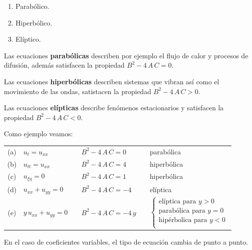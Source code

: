 \begin{enumerate}
\begin{enumerate}[label=(\alph*)]
\item Parabólico.
\item Hiperbólico.
\item Elíptico.
\end{enumerate}
Las ecuaciones \textbf{parabólicas} describen por ejemplo el flujo de calor y procesos de difusión, además satisfacen la propiedad $B^{2} - 4 \, A \, C = 0$.
\par
Las ecuaciones \textbf{hiperbólicas} describen sistemas que vibran así como el movimiento de las ondas, satistacen la propiedad $B^{2} - 4 \, A \, C > 0$.
\par
Las ecuaciones \textbf{elípticas} describe fenómenos estacionarios y satisfacen la propiedad $B^{2} - 4 \, A \, C < 0$.
\par
Como ejemplo veamos:
\begin{table}[H]
\centering
\large
\begin{tabular}{c l p{0.03cm} l p{0.03cm} l}
(a) & \large{$u_{t} = u_{xx}$} & & \large{$B^{2} - 4 \, A \, C = 0$} & & parabólica \\
(b) & \large{$u_{tt} = u_{xx}$} & & \large{$B^{2} - 4 \, A \, C = 4$} & & hiperbólica \\
(c) & \large{$u_{\xi \eta} = 0$} & & \large{$B^{2} - 4 \, A \, C = 1$} & & hiperbólica \\
(d) & \large{$u_{xx} + u_{yy} = 0$} & & \large{$B^{2} - 4 \, A \, C = -4$} & & elíptica \\
(e) & \large{$y \, u_{xx} + u_{yy} = 0$} & & \large{$B^{2} - 4 \, A \, C = - 4 \, y$} & & $\begin{cases}
\mbox{elíptica para } y > 0 \\
\mbox{parabólica para } y = 0 \\
\mbox{hipérbolica para } y < 0 \\
\end{cases}$
\end{tabular}
\end{table}
En el caso de coeficientes variables, el tipo de ecuación cambia de punto a punto.
\end{enumerate}

